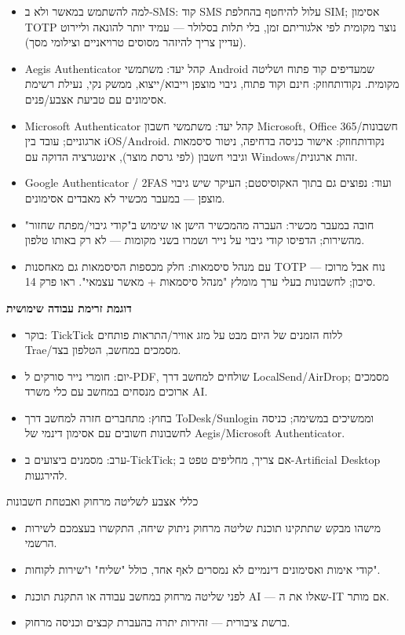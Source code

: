 
\begin{itemize}
  \item למה להשתמש במאשר ולא ב-SMS: קוד SMS עלול להיחטף בהחלפת SIM; אסימון TOTP נוצר מקומית לפי אלגוריתם זמן, בלי תלות בסלולר — עמיד יותר להונאה וליירוט (עדיין צריך להיזהר מסוסים טרויאניים וצילומי מסך).
  \item Aegis Authenticator קהל יעד: משתמשי Android שמעדיפים קוד פתוח ושליטה מקומית. נקודותחוזק: חינם וקוד פתוח, גיבוי מוצפן וייבוא/ייצוא, ממשק נקי, נעילת רשימת אסימונים עם טביעת אצבע/פנים.
  \item Microsoft Authenticator קהל יעד: משתמשי חשבון Microsoft, Office 365/חשבונות ארגוניים; עובד בין iOS/Android. נקודותחוזק: אישור כניסה בדחיפה, ניטור סיסמאות וגיבוי חשבון (לפי גרסת מוצר), אינטגרציה הדוקה עם Windows/זהות ארגונית.
  \item Google Authenticator / 2FAS ועוד: נפוצים גם בתוך האקוסיסטם; העיקר שיש גיבוי מוצפן — במעבר מכשיר לא מאבדים אסימונים.
  \item חובה במעבר מכשיר: העברה מהמכשיר הישן או שימוש ב"קודי גיבוי/מפתח שחזור" מהשירות; הדפיסו קודי גיבוי על נייר ושמרו בשני מקומות — לא רק באותו טלפון.
  \item עם מנהל סיסמאות: חלק מכספות הסיסמאות גם מאחסנות TOTP — נוח אבל מרוכז סיכון; לחשבונות בעלי ערך מומלץ "מנהל סיסמאות + מאשר עצמאי". ראו פרק 14.
\end{itemize}


\textbf{דוגמת זרימת עבודה שימושית}\par

\begin{itemize}
  \item בוקר: TickTick ללוח הזמנים של היום מבט על מזג אוויר/התראות פותחים Trae/מסמכים במחשב, הטלפון בצד.
  \item יום: חומרי נייר סורקים ל-PDF, שולחים למחשב דרך LocalSend/AirDrop; מסמכים ארוכים מנסחים במחשב עם כלי משרד AI.
  \item בחוץ: מתחברים חזרה למחשב דרך ToDesk/Sunlogin וממשיכים במשימה; כניסה לחשבונות חשובים עם אסימון דינמי של Aegis/Microsoft Authenticator.
  \item ערב: מסמנים ביצועים ב-TickTick; אם צריך, מחליפים טפט ב-Artificial Desktop להירגעות.
\end{itemize}

\begin{tcbwarn}{כללי אצבע לשליטה מרחוק ואבטחת חשבונות}
\begin{itemize}
  \item מישהו מבקש שתתקינו תוכנת שליטה מרחוק ניתוק שיחה, התקשרו בעצמכם לשירות הרשמי.
  \item קודי אימות ואסימונים דינמיים לא נמסרים לאף אחד, כולל "שליח" ו"שירות לקוחות".
  \item לפני שליטה מרחוק במחשב עבודה או התקנת תוכנת AI — שאלו את ה-IT אם מותר.
  \item ברשת ציבורית — זהירות יתרה בהעברת קבצים וכניסה מרחוק.
\end{itemize}

\end{tcbwarn}


